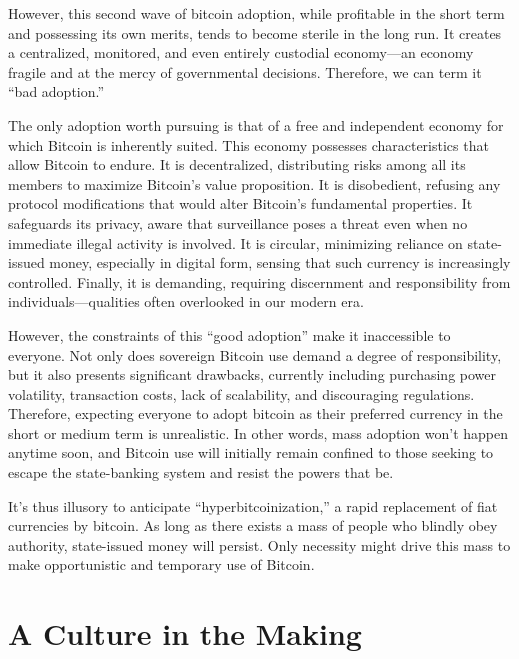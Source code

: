 \documentclass[
  a5paper,
  smalldemyvopaper,10pt,twoside,onecolumn,openright,extrafontsizes,hidelinks]{memoir}
\begin{document}
However, this second wave of bitcoin adoption, while profitable in the
short term and possessing its own merits, tends to become sterile in the
long run. It creates a centralized, monitored, and even entirely
custodial economy---an economy fragile and at the mercy of governmental
decisions. Therefore, we can term it ``bad adoption.''

The only adoption worth pursuing is that of a free and independent
economy for which Bitcoin is inherently suited. This economy possesses
characteristics that allow Bitcoin to endure. It is decentralized,
distributing risks among all its members to maximize Bitcoin's value
proposition. It is disobedient, refusing any protocol modifications that
would alter Bitcoin's fundamental properties. It safeguards its privacy,
aware that surveillance poses a threat even when no immediate illegal
activity is involved. It is circular, minimizing reliance on
state-issued money, especially in digital form, sensing that such
currency is increasingly controlled. Finally, it is demanding, requiring
discernment and responsibility from individuals---qualities often
overlooked in our modern era.

However, the constraints of this ``good adoption'' make it inaccessible
to everyone. Not only does sovereign Bitcoin use demand a degree of
responsibility, but it also presents significant drawbacks, currently
including purchasing power volatility, transaction costs, lack of
scalability, and discouraging regulations. Therefore, expecting everyone
to adopt bitcoin as their preferred currency in the short or medium term
is unrealistic. In other words, mass adoption won't happen anytime soon,
and Bitcoin use will initially remain confined to those seeking to
escape the state-banking system and resist the powers that be.

It's thus illusory to anticipate ``hyperbitcoinization,'' a rapid
replacement of fiat currencies by bitcoin. As long as there exists a
mass of people who blindly obey authority, state-issued money will
persist. Only necessity might drive this mass to make opportunistic and
temporary use of Bitcoin.

\section*{A Culture in the Making}\label{a-culture-in-the-making}

\end{document}
